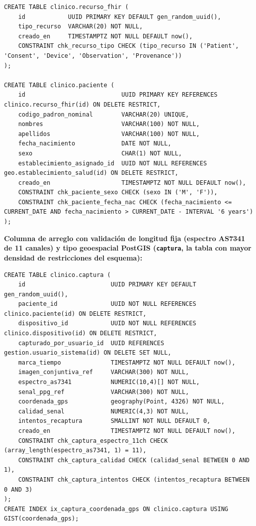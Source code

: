 \documentclass[11pt,a4paper]{article}
\begin{document}
\begin{samepage}\begin{verbatim}
CREATE TABLE clinico.recurso_fhir (
    id            UUID PRIMARY KEY DEFAULT gen_random_uuid(),
    tipo_recurso  VARCHAR(20) NOT NULL,
    creado_en     TIMESTAMPTZ NOT NULL DEFAULT now(),
    CONSTRAINT chk_recurso_tipo CHECK (tipo_recurso IN ('Patient', 'Consent', 'Device', 'Observation', 'Provenance'))
);

CREATE TABLE clinico.paciente (
    id                           UUID PRIMARY KEY REFERENCES clinico.recurso_fhir(id) ON DELETE RESTRICT,
    codigo_padron_nominal        VARCHAR(20) UNIQUE,
    nombres                      VARCHAR(100) NOT NULL,
    apellidos                    VARCHAR(100) NOT NULL,
    fecha_nacimiento             DATE NOT NULL,
    sexo                         CHAR(1) NOT NULL,
    establecimiento_asignado_id  UUID NOT NULL REFERENCES geo.establecimiento_salud(id) ON DELETE RESTRICT,
    creado_en                    TIMESTAMPTZ NOT NULL DEFAULT now(),
    CONSTRAINT chk_paciente_sexo CHECK (sexo IN ('M', 'F')),
    CONSTRAINT chk_paciente_fecha_nac CHECK (fecha_nacimiento <= CURRENT_DATE AND fecha_nacimiento > CURRENT_DATE - INTERVAL '6 years')
);
\end{verbatim}\end{samepage}

\textbf{Columna de arreglo con validación de longitud fija (espectro AS7341 de 11 canales) y tipo geoespacial PostGIS (\texttt{captura}, la tabla con mayor densidad de restricciones del esquema):}

\begin{samepage}\begin{verbatim}
CREATE TABLE clinico.captura (
    id                        UUID PRIMARY KEY DEFAULT gen_random_uuid(),
    paciente_id               UUID NOT NULL REFERENCES clinico.paciente(id) ON DELETE RESTRICT,
    dispositivo_id            UUID NOT NULL REFERENCES clinico.dispositivo(id) ON DELETE RESTRICT,
    capturado_por_usuario_id  UUID REFERENCES gestion.usuario_sistema(id) ON DELETE SET NULL,
    marca_tiempo              TIMESTAMPTZ NOT NULL DEFAULT now(),
    imagen_conjuntiva_ref     VARCHAR(300) NOT NULL,
    espectro_as7341           NUMERIC(10,4)[] NOT NULL,
    senal_ppg_ref             VARCHAR(300) NOT NULL,
    coordenada_gps            geography(Point, 4326) NOT NULL,
    calidad_senal             NUMERIC(4,3) NOT NULL,
    intentos_recaptura        SMALLINT NOT NULL DEFAULT 0,
    creado_en                 TIMESTAMPTZ NOT NULL DEFAULT now(),
    CONSTRAINT chk_captura_espectro_11ch CHECK (array_length(espectro_as7341, 1) = 11),
    CONSTRAINT chk_captura_calidad CHECK (calidad_senal BETWEEN 0 AND 1),
    CONSTRAINT chk_captura_intentos CHECK (intentos_recaptura BETWEEN 0 AND 3)
);
CREATE INDEX ix_captura_coordenada_gps ON clinico.captura USING GIST(coordenada_gps);
\end{verbatim}\end{samepage}
\end{document}
